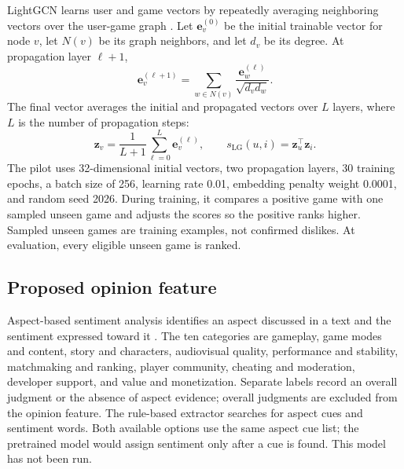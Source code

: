 \documentclass[11pt]{article}
\begin{document}
LightGCN learns user and game vectors by repeatedly averaging neighboring vectors over the user-game graph \cite{lightgcn}. Let $\mathbf{e}_v^{(0)}$ be the initial trainable vector for node $v$, let $N(v)$ be its graph neighbors, and let $d_v$ be its degree. At propagation layer $\ell+1$,
\[
  \mathbf{e}_v^{(\ell+1)}
  =\sum_{w\in N(v)}
    \frac{\mathbf{e}_w^{(\ell)}}{\sqrt{d_vd_w}}.
\]
The final vector averages the initial and propagated vectors over $L$ layers, where $L$ is the number of propagation steps:
\[
  \mathbf{z}_v=\frac{1}{L+1}\sum_{\ell=0}^{L}\mathbf{e}_v^{(\ell)},
  \qquad
  s_{\mathrm{LG}}(u,i)=\mathbf{z}_u^\top\mathbf{z}_i.
\]
The pilot uses 32-dimensional initial vectors, two propagation layers, 30 training epochs, a batch size of 256, learning rate 0.01, embedding penalty weight 0.0001, and random seed 2026. During training, it compares a positive game with one sampled unseen game and adjusts the scores so the positive ranks higher. Sampled unseen games are training examples, not confirmed dislikes. At evaluation, every eligible unseen game is ranked.

\subsection{Proposed opinion feature}

Aspect-based sentiment analysis identifies an aspect discussed in a text and the sentiment expressed toward it \cite{absa}. The ten categories are gameplay, game modes and content, story and characters, audiovisual quality, performance and stability, matchmaking and ranking, player community, cheating and moderation, developer support, and value and monetization. Separate labels record an overall judgment or the absence of aspect evidence; overall judgments are excluded from the opinion feature. The rule-based extractor searches for aspect cues and sentiment words. Both available options use the same aspect cue list; the pretrained model would assign sentiment only after a cue is found. This model has not been run.
\end{document}
